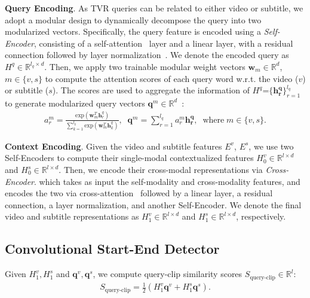 \documentclass[runningheads]{llncs}
\begin{document}
\kern1mm
\noindent\textbf{Query Encoding}.
As TVR queries can be related to either video or subtitle, we adopt a modular design to dynamically decompose the query into two modularized vectors.
Specifically, the query feature is encoded using a \textit{Self-Encoder}, consisting of a self-attention~\cite{vaswani2017attention} layer and a linear layer, with a residual~\cite{he2016deep} connection followed by layer normalization~\cite{ba2016layer}. 
We denote the encoded query as $H^{q} \in \mathbb{R}^{l_q \times d}$.
Then, we apply two trainable modular weight vectors $\mathbf{w}_{m} \in \mathbb{R}^{d}$, $m \in \{v, s\}$ to compute the attention scores of each query word w.r.t. the video ($v$) or subtitle ($s$). 
The scores are used to aggregate the information of $H^{q}\mbox{=}\{\mathbf{h^{q}_{r}}\}_{r=1}^{l_q}$ to generate modularized query vectors $\mathbf{q}^{m} \in \mathbb{R}^{d}$~\cite{yu2018mattnet}:
\begin{align}
    a^{m}_r = \frac{\mathrm{exp}(\mathbf{w}_m^T \mathbf{h}^{q}_r)}{\sum_{k=1}^{l_q} \mathrm{exp}(\mathbf{w}_m^T \mathbf{h}^{q}_k)}, \;\;\mathbf{q}^m = \sum_{r=1}^{l_q} a^{m}_r \mathbf{h^{q}_{r}}, \;\;\mathrm{where}\;m \in \{v, s\}.
\end{align}


\kern1mm
\noindent\textbf{Context Encoding}.
Given the video and subtitle features $E^v$, $E^s$, we use two Self-Encoders to compute their single-modal contextualized features $H^{v}_{0} \in \mathbb{R}^{l \times d}$ and $H^{s}_{0} \in \mathbb{R}^{l \times d}$. 
Then, we encode their cross-modal representations via \textit{Cross-Encoder}.
which takes as input the self-modality and cross-modality features, and encodes the two via  cross-attention~\cite{vaswani2017attention} followed by a linear layer, a residual connection, a layer normalization, and another Self-Encoder.
We denote the final video and subtitle representations as $H^{v}_{1} \in \mathbb{R}^{l \times d}$ and $H^{s}_{1} \in \mathbb{R}^{l \times d}$, respectively.


\subsection{Convolutional Start-End Detector}\label{subsec:convse}
Given $H^{v}_{1}, H^{s}_{1}$ and $\mathbf{q}^v, \mathbf{q}^s$, we compute query-clip similarity scores $S_{\mathrm{query\mbox{-}clip}} \in \mathbb{R}^{l}$:
\begin{align}
    \label{eq:query-clip}
    S_{\mathrm{query\mbox{-}clip}} = \frac{1}{2}(H^{v}_{1} \mathbf{q}^v +  H^{s}_{1} \mathbf{q}^s).
\end{align}
\end{document}
